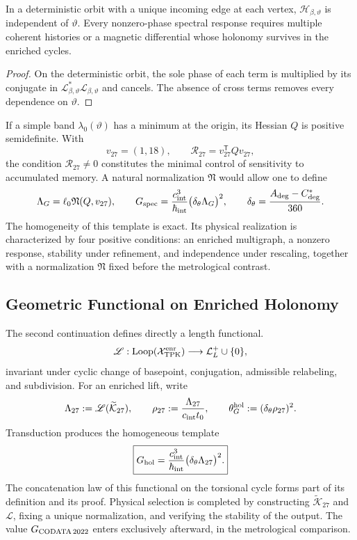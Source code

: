 \begin{proposition}
\label{prop:interferencia-selector-G-rev11}
In a deterministic orbit with a unique incoming edge at each vertex,
\(\mathcal H_{\beta,\vartheta}\) is independent of \(\vartheta\). Every nonzero-phase spectral
response requires multiple coherent histories or a magnetic differential
whose holonomy survives in the enriched cycles.
\end{proposition}

\begin{proof}
On the deterministic orbit, the sole phase of each term is multiplied by its
conjugate in
\(\mathcal L_{\beta,\vartheta}^{*}\mathcal L_{\beta,\vartheta}\)
and cancels. The absence of cross terms removes every dependence on
\(\vartheta\).
\end{proof}

If a simple band \(\lambda_0(\vartheta)\) has a minimum at the origin,
its Hessian \(Q\) is positive semidefinite. With
\[
 v_{27}=(1,18),
 \qquad
 \mathcal R_{27}=v_{27}^{\mathsf T}Qv_{27},
\]
the condition \(\mathcal R_{27}\neq0\) constitutes the minimal control of
sensitivity to accumulated memory. A natural normalization
\(\mathfrak N\) would allow one to define
\[
 \Lambda_G=\ell_0\mathfrak N(Q,v_{27}),
 \qquad
 G_{\rm spec}
 =\frac{c_{\rm int}^{3}}{\hbar_{\rm int}}
  \bigl(\delta_\theta\Lambda_G\bigr)^2,
 \qquad
 \delta_\theta=\frac{A_{\rm deg}-C_{\rm deg}^{\ast}}{360}.
\]
The homogeneity of this template is exact. Its physical realization is
characterized by four positive conditions: an enriched multigraph,
a nonzero response, stability under refinement, and independence under rescaling,
together with a normalization \(\mathfrak N\) fixed before the
metrological contrast.

\subsection{Geometric Functional on Enriched Holonomy}

The second continuation defines directly a length functional.
\[
 \mathscr L:
 \operatorname{Loop}(\mathcal X_{\rm TPK}^{\rm enr})
 \longrightarrow\mathcal L_L^+\cup\{0\},
\]
invariant under cyclic change of basepoint, conjugation, admissible
relabeling, and subdivision. For an enriched lift, write
\[
 \Lambda_{27}:=\mathscr L(\widetilde{\mathcal K}_{27}),
 \qquad
 \rho_{27}:=\frac{\Lambda_{27}}{c_{\rm int}t_0},
 \qquad
 \theta_G^{\rm hol}:=(\delta_\theta\rho_{27})^2.
\]
Transduction produces the homogeneous template
\begin{equation}
 \boxed{
 G_{\rm hol}
 =\frac{c_{\rm int}^{3}}{\hbar_{\rm int}}
  \bigl(\delta_\theta\Lambda_{27}\bigr)^2.}
 \label{eq:plantilla-holonomia-G-rev11}
\end{equation}
The concatenation law of this functional on the torsional cycle forms
part of its definition and its proof. Physical selection is completed
by constructing \(\widetilde{\mathcal K}_{27}\) and \(\mathscr L\), fixing a
unique normalization, and verifying the stability of the output. The value
\(G_{\rm CODATA\,2022}\) enters exclusively afterward, in the metrological
comparison.

